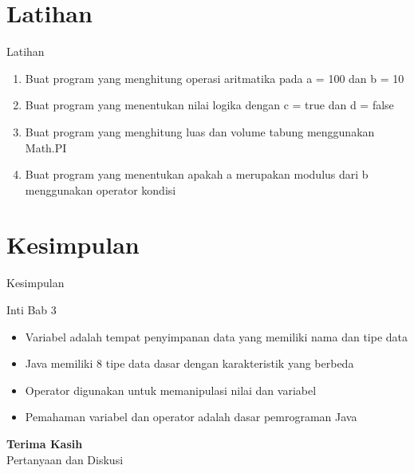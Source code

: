 \documentclass{beamer}
\begin{document}
\section{Latihan}
\begin{frame}{Latihan}
  \begin{enumerate}
    \item Buat program yang menghitung operasi aritmatika pada a = 100 dan b = 10
    \item Buat program yang menentukan nilai logika dengan c = true dan d = false
    \item Buat program yang menghitung luas dan volume tabung menggunakan Math.PI
    \item Buat program yang menentukan apakah a merupakan modulus dari b menggunakan operator kondisi
  \end{enumerate}
\end{frame}

\section{Kesimpulan}
\begin{frame}{Kesimpulan}
  \begin{alertblock}{Inti Bab 3}
    \begin{itemize}
      \item Variabel adalah tempat penyimpanan data yang memiliki nama dan tipe data
      \item Java memiliki 8 tipe data dasar dengan karakteristik yang berbeda
      \item Operator digunakan untuk memanipulasi nilai dan variabel
      \item Pemahaman variabel dan operator adalah dasar pemrograman Java
    \end{itemize}
  \end{alertblock}
\end{frame}

\begin{frame}[standout]
  \Huge \textbf{Terima Kasih} \\[1.5em]
  \Large Pertanyaan dan Diskusi
\end{frame}
\end{document}
